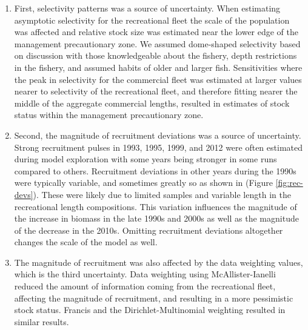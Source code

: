 \documentclass[11pt,
  english,
  a4paper,
]{article}
\begin{document}
\begin{enumerate}
\def\labelenumi{\arabic{enumi}.}
\item

  First, selectivity patterns was a source of uncertainty. When estimating asymptotic selectivity for the recreational fleet the scale of the population was affected and relative stock size was estimated near the lower edge of the management precautionary zone. We assumed dome-shaped selectivity based on discussion with those knowledgeable about the fishery, depth restrictions in the fishery, and assumed habits of older and larger fish. Sensitivities where the peak in selectivity for the commercial fleet was estimated at larger values nearer to selectivity of the recreational fleet, and therefore fitting nearer the middle of the aggregate commercial lengths, resulted in estimates of stock status within the management precautionary zone.

  \leavevmode\tagmcend\tagstructend\par
\item

  Second, the magnitude of recruitment deviations was a source of uncertainty. Strong recruitment pulses in 1993, 1995, 1999, and 2012 were often estimated during model exploration with some years being stronger in some runs compared to others. Recruitment deviations in other years during the 1990s were typically variable, and sometimes greatly so as shown in (Figure \ref{fig:rec-devs}). These were likely due to limited samples and variable length in the recreational length compositions. This variation influences the magnitude of the increase in biomass in the late 1990s and 2000s as well as the magnitude of the decrease in the 2010s. Omitting recruitment deviations altogether changes the scale of the model as well.

  \leavevmode\tagmcend\tagstructend\par
\item

  The magnitude of recruitment was also affected by the data weighting values, which is the third uncertainty. Data weighting using McAllister-Ianelli reduced the amount of information coming from the recreational fleet, affecting the magnitude of recruitment, and resulting in a more pessimistic stock status. Francis and the Dirichlet-Multinomial weighting resulted in similar results.


\end{enumerate}
\end{document}
